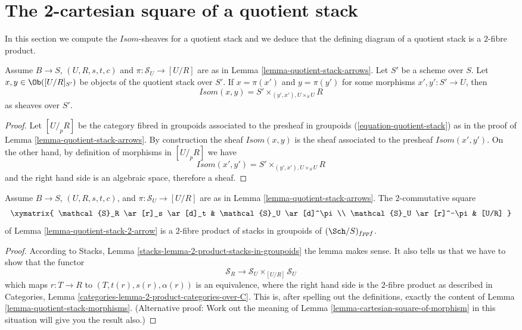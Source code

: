 \section{The 2-cartesian square of a quotient stack}
\label{section-quotient-stack-2-cartesian}

\noindent
In this section we compute the $\mathit{Isom}$-sheaves for a quotient stack
and we deduce that the defining diagram of a quotient stack is a
$2$-fibre product.

\begin{lemma}
\label{lemma-quotient-stack-morphisms}
Assume $B \to S$, $(U, R, s, t, c)$ and $\pi : \mathcal{S}_U \to [U/R]$
are as in
Lemma \ref{lemma-quotient-stack-arrows}.
Let $S'$ be a scheme over $S$.
Let $x, y \in \Ob([U/R]_{S'})$ be objects of the
quotient stack over $S'$. If $x = \pi(x')$ and $y = \pi(y')$ for
some morphisms $x', y' : S' \to U$, then
$$
\mathit{Isom}(x, y) = S' \times_{(y', x'), U \times_S U} R
$$
as sheaves over $S'$.
\end{lemma}

\begin{proof}
Let $[U/_{\!p}R]$ be the category fibred in groupoids associated to
the presheaf in groupoids (\ref{equation-quotient-stack}) as in the proof of
Lemma \ref{lemma-quotient-stack-arrows}.
By construction the sheaf $\mathit{Isom}(x, y)$ is the sheaf associated
to the presheaf $\mathit{Isom}(x', y')$. On the other hand, by definition
of morphisms in $[U/_{\!p}R]$ we have
$$
\mathit{Isom}(x', y') = S' \times_{(y', x'), U \times_S U} R
$$
and the right hand side is an algebraic space, therefore a sheaf.
\end{proof}

\begin{lemma}
\label{lemma-quotient-stack-2-cartesian}
Assume $B \to S$, $(U, R, s, t, c)$, and $\pi : \mathcal{S}_U \to [U/R]$
are as in
Lemma \ref{lemma-quotient-stack-arrows}.
The $2$-commutative square
$$
\xymatrix{
\mathcal{S}_R \ar[r]_s \ar[d]_t & \mathcal{S}_U \ar[d]^\pi \\
\mathcal{S}_U \ar[r]^-\pi & [U/R]
}
$$
of
Lemma \ref{lemma-quotient-stack-2-arrow}
is a $2$-fibre product of stacks in groupoids of $(\Sch/S)_{fppf}$.
\end{lemma}

\begin{proof}
According to
Stacks, Lemma \ref{stacks-lemma-2-product-stacks-in-groupoids}
the lemma makes sense. It also tells us that we have to show that
the functor
$$
\mathcal{S}_R \longrightarrow \mathcal{S}_U \times_{[U/R]} \mathcal{S}_U
$$
which maps $r : T \to R$ to $(T, t(r), s(r), \alpha(r))$ is an equivalence,
where the right hand side is the $2$-fibre product as described in
Categories, Lemma \ref{categories-lemma-2-product-categories-over-C}.
This is, after spelling out the definitions, exactly the content of
Lemma \ref{lemma-quotient-stack-morphisms}. (Alternative proof: Work out
the meaning of
Lemma \ref{lemma-cartesian-square-of-morphism}
in this situation will give you the result also.)
\end{proof}

